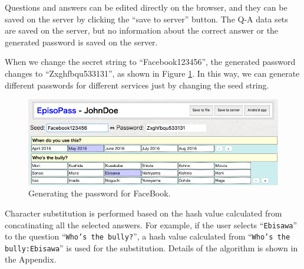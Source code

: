\documentclass{sigchi}
\begin{document}
Questions and answers can be edited directly on the browser, and they can be
saved on the server by clicking the ``save to server'' button.
The Q-A data sets are saved on the server,
but no information about the correct answer or the
generated password is saved on the server.


When we change the secret string to ``\textsf{Facebook123456}'',
the generated password changes to ``\textsf{Zxghfbqu533131}'',
as shown in Figure \ref{web2}.
In this way, we can generate different passwords for
different services just by changing the seed string.

\begin{figure}[H]
\centering
\includegraphics[width=1.0\columnwidth]{figures/0e2820c279afc70520482e0fc53b6ed9}
\caption{Generating the password for FaceBook.}
\label{web2}
\end{figure}



Character substitution is performed based on the hash value
calculated from concatinating all the selected answers.
For example, if the user selects ``\texttt{Ebisawa}'' to the question ``\texttt{Who's the bully?}'',
a hash value calculated from  ``\texttt{Who's the bully:Ebisawa}''
is used for the substitution.
Details of the algorithm is shown in the Appendix.

\end{document}
